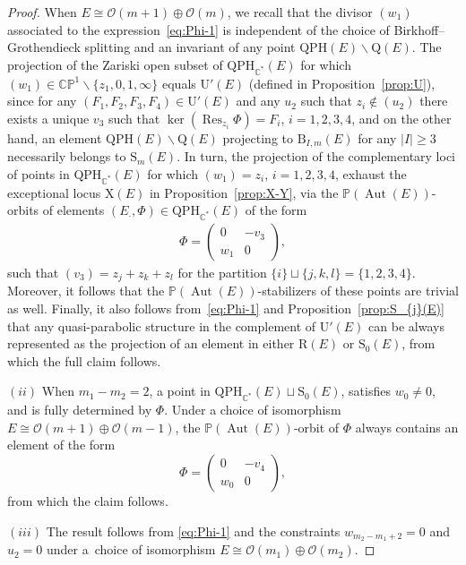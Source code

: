 \documentclass[pdftex]{sigma}
\newcommand{\field}[1]{\ensuremath{\mathbb{#1}}}
\newcommand{\CC}{\field{C}}
\newcommand{\PP}{\field{P}}
\newcommand{\calO}{\mathcal{O}}
\newcommand{\qp}{\boldsymbol{\cdot}}
\DeclareMathOperator{\Aut}{Aut}
\DeclareMathOperator{\Res}{Res}
\numberwithin{equation}{section}
\begin{document}
\begin{proof}
When $E\cong \calO(m+1)\oplus\calO(m)$, we recall that the divisor $(w_{1})$ associated to the expression~\eqref{eq:Phi-1} is independent of the choice of Birkhoff--Grothendieck splitting and an invariant of any point $\mathrm{QPH}(E)\backslash\mathrm{Q}(E)$. The projection of the Zariski open subset of $\mathrm{QPH}_{\CC^{*}}(E)$ for which $(w_{1})\in\CC\PP^{1}\backslash\{z_{1},0,1,\infty\}$ equals $\mathrm{U}'(E)$ (defined in Proposition~\ref{prop:U}), since for any $(F_{1},F_{2},F_{3},F_{4})\in\mathrm{U}'(E)$ and any $u_{2}$ such that $z_{i}\not\in(u_{2})$ there exists a unique $v_{3}$ such that $\ker(\Res_{z_{i}}\Phi) = F_{i}$, $i=1,2,3,4$, and on the other hand, an element $\mathrm{QPH}(E)\backslash\mathrm{Q}(E)$ projecting to $\mathrm{B}_{I,m}(E)$ for any $\vert I\vert \geq 3$ necessa\-rily belongs to $\mathrm{S}_{m}(E)$. In turn, the projection of the complementary loci of points in $\mathrm{QPH}_{\CC^{*}}(E)$ for which $(w_{1})=z_{i}$, $i=1,2,3,4$,
exhaust the exceptional locus $\mathrm{X}(E)$ in Proposition~\ref{prop:X-Y}, via the $\PP(\Aut(E))$-orbits of elements $(E_{\qp},\Phi)\in\mathrm{QPH}_{\CC^{*}}(E)$ of the form
\begin{gather}\label{eq:HX-1}
\Phi = \begin{pmatrix}
0 & -v_{3}\\
w_{1} & 0
\end{pmatrix}\!,
\end{gather}
such that $(v_{3}) = z_{j} + z_{k} + z_{l}$ for the partition $\{i\}\sqcup\{j,k,l\}=\{1,2,3,4\}$. Moreover, it follows that the $\PP(\Aut(E))$-stabilizers of these points are trivial as well. Finally, it also follows from~\eqref{eq:Phi-1} and Proposition~\ref{prop:S_{j}(E)} that any quasi-parabolic structure in the complement of $\mathrm{U}'(E)$ can be always represented as the projection of an element in either $\mathrm{R}(E)$ or $\mathrm{S}_{0}(E)$, from which the full claim follows.

$(ii)$ When $m_{1}-m_{2}=2$, a point in $\mathrm{QPH}_{\CC^{*}}(E)\sqcup \mathrm{S}_{0}(E)$, satisfies $w_{0}\neq 0$, and is fully determined by $\Phi$. Under a choice of isomorphism $E\cong\calO(m+1)\oplus\calO(m-1)$, the $\PP(\Aut(E))$-orbit of $\Phi$ always contains an element of the form
\[
\Phi = \begin{pmatrix}
0 & -v_{4}\\
w_{0} & 0
\end{pmatrix}\!,
\]
from which the claim follows.

$(iii)$ The result follows from \eqref{eq:Phi-1} and the constraints $w_{m_{2}-m_{1}+2}=0$ and $u_{2}=0$ under a~choice of isomorphism $E\cong \calO(m_{1})\oplus\calO(m_{2})$.
\end{proof}
\end{document}

